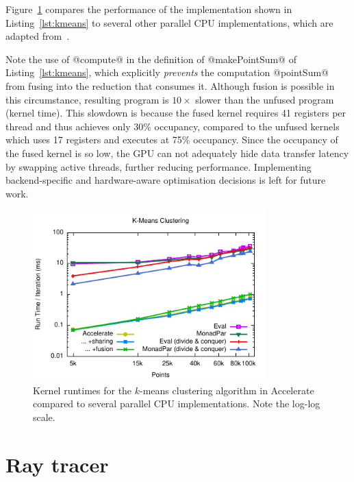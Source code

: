 Figure~\ref{fig:kmeans} compares the performance of the implementation shown in
Listing~\ref{lst:kmeans} to several other parallel CPU implementations, which
are adapted from~\cite{Marlow:2013wn}.

Note the use of @compute@ in the definition of @makePointSum@ of
Listing~\ref{lst:kmeans}, which explicitly \emph{prevents} the computation
@pointSum@ from fusing into the reduction that consumes it. Although fusion is
possible in this circumstance, resulting program is $10\times$ slower than the
unfused program (kernel time). This slowdown is because the fused kernel
requires 41 registers per thread and thus achieves only 30\% occupancy, compared
to the unfused kernels which uses 17 registers and executes at 75\% occupancy.
Since the occupancy of the fused kernel is so low, the GPU can not adequately
hide data transfer latency by swapping active threads, further reducing
performance. Implementing backend-specific and hardware-aware optimisation
decisions is left for future work.

\begin{figure}
    \centering
    \includegraphics[width=0.8\textwidth]{images/results/k-means/k-means}
    \caption[K-means clustering kernel benchmarks]{Kernel runtimes for the
        $k$-means clustering algorithm in Accelerate compared to several
        parallel CPU implementations. Note the log-log scale.}
\label{fig:kmeans}
\end{figure}


\section{Ray tracer}
\label{sec:ray}

